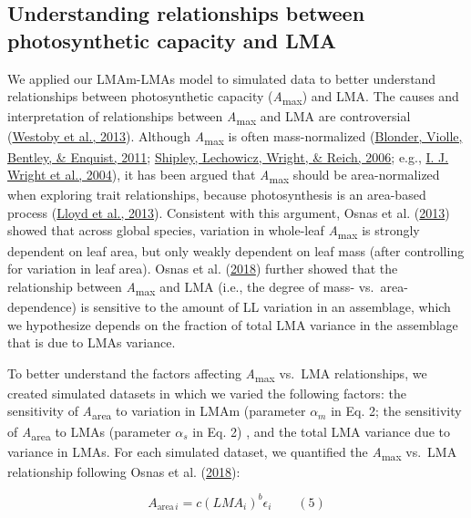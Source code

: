 \documentclass[
  12pt,
  letterpaper,
  DIV=11,
  numbers=noendperiod]{scrartcl}
\begin{document}
\hypertarget{understanding-relationships-between-photosynthetic-capacity-and-lma}{%
\subsection{Understanding relationships between photosynthetic capacity
and
LMA}\label{understanding-relationships-between-photosynthetic-capacity-and-lma}}

We applied our LMAm-LMAs model to simulated data to better understand
relationships between photosynthetic capacity
(\emph{A}\textsubscript{max}) and LMA. The causes and interpretation of
relationships between \emph{A}\textsubscript{max} and LMA are
controversial (\protect\hyperlink{ref-Westoby2013}{Westoby et al.,
2013}). Although \emph{A}\textsubscript{max} is often mass-normalized
(\protect\hyperlink{ref-Blonder2011}{Blonder, Violle, Bentley, \&
Enquist, 2011}; \protect\hyperlink{ref-Shipley2006}{Shipley, Lechowicz,
Wright, \& Reich, 2006}; e.g., \protect\hyperlink{ref-Wright2004a}{I. J.
Wright et al., 2004}), it has been argued that
\emph{A}\textsubscript{max} should be area-normalized when exploring
trait relationships, because photosynthesis is an area-based process
(\protect\hyperlink{ref-Lloyd2013}{Lloyd et al., 2013}). Consistent with
this argument, Osnas et al. (\protect\hyperlink{ref-Osnas2013}{2013})
showed that across global species, variation in whole-leaf
\emph{A}\textsubscript{max} is strongly dependent on leaf area, but only
weakly dependent on leaf mass (after controlling for variation in leaf
area). Osnas et al. (\protect\hyperlink{ref-Osnas2018}{2018}) further
showed that the relationship between \emph{A}\textsubscript{max} and LMA
(i.e., the degree of mass- vs.~area-dependence) is sensitive to the
amount of LL variation in an assemblage, which we hypothesize depends on
the fraction of total LMA variance in the assemblage that is due to LMAs
variance.

To better understand the factors affecting \emph{A}\textsubscript{max}
vs.~LMA relationships, we created simulated datasets in which we varied
the following factors: the sensitivity of \emph{A}\textsubscript{area}
to variation in LMAm (parameter \(\alpha_m\) in Eq. 2; the sensitivity
of \emph{A}\textsubscript{area} to LMAs (parameter \(\alpha_s\) in Eq.
2) , and the total LMA variance due to variance in LMAs. For each
simulated dataset, we quantified the \emph{A}\textsubscript{max} vs.~LMA
relationship following Osnas et al.
(\protect\hyperlink{ref-Osnas2018}{2018}):

\[
A_{\mathrm{area} \, i} = c (LMA_i)^{b}\epsilon_i \qquad(5)
\]
\end{document}
